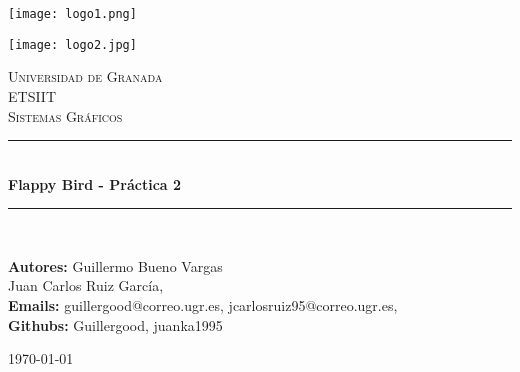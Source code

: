 \documentclass[12zpt]{article}
\begin{document}
\begin{center}																		%
\newcommand{\HRule}{\rule{\linewidth}{0.5mm}}									%
\begin{minipage}{0.48\textwidth} \begin{flushleft}
\texttt{[image: logo1.png]}
\end{flushleft}\end{minipage}
\begin{minipage}{0.48\textwidth} \begin{flushright}
\texttt{[image: logo2.jpg]}
\end{flushright}\end{minipage}

\vspace*{-1.5cm}								%
\textsc{\huge Universidad de Granada\\ \vspace{5px} ETSIIT}\\[1.5cm]	

\textsc{\LARGE Sistemas Gráficos}\\[1.5cm]													%

 			\vspace*{1cm}																		%
\HRule \\[0.4cm]																	%
{ \huge \bfseries Flappy Bird - Práctica 2}\\[0.4cm]	%
\HRule \\[1.5cm]																	%
\begin{minipage}{0.46\textwidth}													%
\begin{center} \large															%
\textbf{Autores:} Guillermo Bueno Vargas\\
Juan Carlos Ruiz García,\\
\textbf{Emails:} guillergood@correo.ugr.es, jcarlosruiz95@correo.ugr.es,\\
\textbf{Githubs:} Guillergood, juanka1995\\ 
\end{center}																		%
\end{minipage}		
\vspace{7cm} 																				
\begin{center}																					
{\large \today}																	%
 			\end{center}												  						
\end{center}							 											
																					
\end{document}
